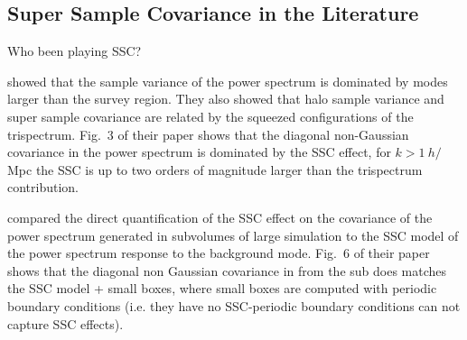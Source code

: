 \newcommand{\sph}[2]{Y^\text{R}_{l_#1 m_#1}(\hat{#2})}

\newcommand{\jl}[1]{j_{l_#1}}
\newcommand{\dk}{\frac{ d^3 \mathbf{k}}{(2 \pi)^3}} 
\newcommand{ \dkv}[1]{\frac{ d^3 \mathbf{k}_{#1}}{(2 \pi)^3}} 
\newcommand{\obs}{\mathcal{O}}

\subsection{Super Sample Covariance in the Literature}

Who been playing SSC? 

\cite{2013PhRvD..87l3504T} showed that the sample variance of the power spectrum is dominated by modes larger than the survey region. They also showed that halo sample variance and super sample covariance are related by the squeezed configurations of the trispectrum. Fig.~3 of their paper shows that the diagonal non-Gaussian covariance in the power spectrum is dominated by the SSC effect, for $k > 1 ~h/$Mpc the SSC is up to two orders of magnitude larger than the trispectrum contribution. 

\cite{2014PhRvD..89h3519L} compared the direct quantification of the SSC effect on the covariance of the power spectrum generated in subvolumes of large simulation to the SSC model of the power spectrum response to the background mode. Fig.~6 of their paper shows that the diagonal non Gaussian covariance in from the sub does matches the SSC model + small boxes, where small boxes are computed with periodic boundary conditions (i.e. they have no SSC-periodic boundary conditions can not capture SSC effects). 